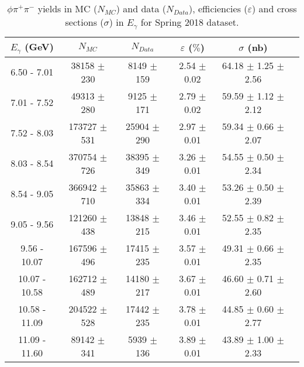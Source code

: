 \begin{center}
\null
\vfill
\begin{table}[H]
    \caption{$\phi \pi^{+}\pi^{-}$ yields in MC ($N_{MC}$) and data ($N_{Data}$), efficiencies ($\varepsilon$) and cross sections ($\sigma$) in $E_{\gamma}$ for Spring 2018 dataset.}
    \label{tab.xsec_ul.phi2pi.3.1}
    \begin{tabular}{|c|c|c|c|c|c|}
    \hline
    $E_{\gamma}$ (GeV) & $N_{MC}$ & $N_{Data}$ & $\varepsilon$ ($\%$) & $\sigma$ (nb) \\ 
    \hline
    6.50 - 7.01 & 38158 $\pm$ 230 & 8149 $\pm$ 159 & 2.54 $\pm$ 0.02 & 64.18 $\pm$ 1.25 $\pm$ 2.56 \\ 
    7.01 - 7.52 & 49313 $\pm$ 280 & 9125 $\pm$ 171 & 2.79 $\pm$ 0.02 & 59.59 $\pm$ 1.12 $\pm$ 2.12 \\ 
    7.52 - 8.03 & 173727 $\pm$ 531 & 25904 $\pm$ 290 & 2.97 $\pm$ 0.01 & 59.34 $\pm$ 0.66 $\pm$ 2.07 \\ 
    8.03 - 8.54 & 370754 $\pm$ 726 & 38395 $\pm$ 349 & 3.26 $\pm$ 0.01 & 54.55 $\pm$ 0.50 $\pm$ 2.34 \\ 
    8.54 - 9.05 & 366942 $\pm$ 710 & 35863 $\pm$ 334 & 3.40 $\pm$ 0.01 & 53.26 $\pm$ 0.50 $\pm$ 2.39 \\ 
    9.05 - 9.56 & 121260 $\pm$ 438 & 13848 $\pm$ 215 & 3.46 $\pm$ 0.01 & 52.55 $\pm$ 0.82 $\pm$ 2.35 \\ 
    9.56 - 10.07 & 167596 $\pm$ 496 & 17415 $\pm$ 235 & 3.57 $\pm$ 0.01 & 49.31 $\pm$ 0.66 $\pm$ 2.35 \\ 
    10.07 - 10.58 & 162712 $\pm$ 489 & 14180 $\pm$ 217 & 3.67 $\pm$ 0.01 & 46.60 $\pm$ 0.71 $\pm$ 2.60 \\ 
    10.58 - 11.09 & 204522 $\pm$ 528 & 17442 $\pm$ 235 & 3.78 $\pm$ 0.01 & 44.85 $\pm$ 0.60 $\pm$ 2.77 \\ 
    11.09 - 11.60 & 89142 $\pm$ 341 & 5939 $\pm$ 136 & 3.89 $\pm$ 0.01 & 43.89 $\pm$ 1.00 $\pm$ 2.33 \\
   \hline
\end{tabular}
\end{table}
\end{center}

